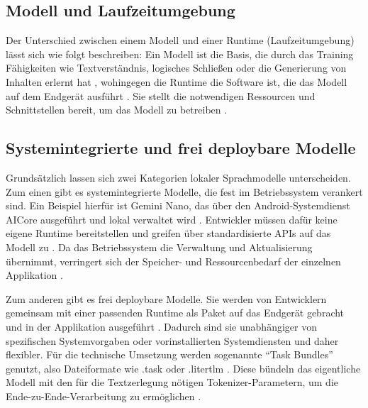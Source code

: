 \subsection{Modell und Laufzeitumgebung}
\label{subsec:MvsL}
Der Unterschied zwischen einem Modell und einer Runtime (Laufzeitumgebung) lässt sich wie folgt beschreiben: Ein Modell ist die Basis, die durch das Training Fähigkeiten wie Textverständnis, logisches Schließen oder die Generierung von Inhalten erlernt hat \autocite{edgellm_review}, wohingegen die Runtime die Software ist, die das Modell auf dem Endgerät ausführt \autocite{edgellm_review,mediapipe_llm}. Sie stellt die notwendigen Ressourcen und Schnittstellen bereit, um das Modell zu betreiben \autocite{edgellm_review}.
\vspace{\baselineskip}

\subsection{Systemintegrierte und frei deploybare Modelle}
\label{subsec:systemintegrierte-und-frei-deploybare-modelle}
Grundsätzlich lassen sich zwei Kategorien lokaler Sprachmodelle unterscheiden. Zum einen gibt es systemintegrierte Modelle, die fest im Betriebssystem verankert sind. Ein Beispiel hierfür ist Gemini Nano, das über den Android-Systemdienst AICore ausgeführt und lokal verwaltet wird \autocite{gemininano}. Entwickler müssen dafür keine eigene Runtime bereitstellen und greifen über standardisierte \acp{API} auf das Modell zu \autocite{gemininano}. Da das Betriebssystem die Verwaltung und Aktualisierung übernimmt, verringert sich der Speicher- und Ressourcenbedarf der einzelnen Applikation \autocite{gemininano}.
\vspace{\baselineskip}

\noindent Zum anderen gibt es frei deploybare Modelle. Sie werden von Entwicklern gemeinsam mit einer passenden Runtime als Paket auf das Endgerät gebracht und in der Applikation ausgeführt \autocite{guo2025llm, mediapipe_llm}. Dadurch sind sie unabhängiger von spezifischen Systemvorgaben oder vorinstallierten Systemdiensten und daher flexibler. Für die technische Umsetzung werden sogenannte \enquote{Task Bundles} genutzt, also Dateiformate wie .task oder .litertlm \autocite{mediapipe_llm}. Diese bündeln das eigentliche Modell mit den für die Textzerlegung nötigen Tokenizer-Parametern, um die Ende-zu-Ende-Verarbeitung zu ermöglichen \autocite{mediapipe_llm}.

